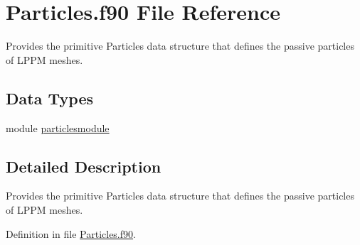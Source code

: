 \hypertarget{_particles_8f90}{\section{Particles.\+f90 File Reference}
\label{_particles_8f90}
}


Provides the primitive Particles data structure that defines the passive particles of L\+P\+P\+M meshes.  


\subsection*{Data Types}
\begin{DoxyCompactItemize}
\item 
module \hyperlink{classparticlesmodule}{particlesmodule}
\end{DoxyCompactItemize}


\subsection{Detailed Description}
Provides the primitive Particles data structure that defines the passive particles of L\+P\+P\+M meshes. 



Definition in file \hyperlink{_particles_8f90_source}{Particles.\+f90}.

